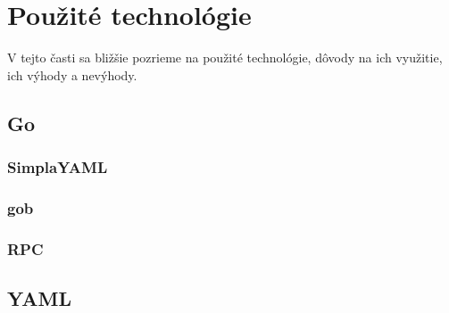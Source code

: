 \chapter{Pou\v{z}it\'{e} technol\'{o}gie}
\label{ch:tech}

V tejto časti sa bližšie pozrieme na použité technológie, dôvody na ich využitie,
ich výhody a nevýhody.

\section{Go}
\label{sec:golang}

\subsection{SimplaYAML}
\label{sec:golang:simpleyaml}

\subsection{gob}
\label{sec:golang:gob}

\subsection{RPC}
\label{sec:golang:rpc}

\section{YAML}
\label{sec:yaml}
